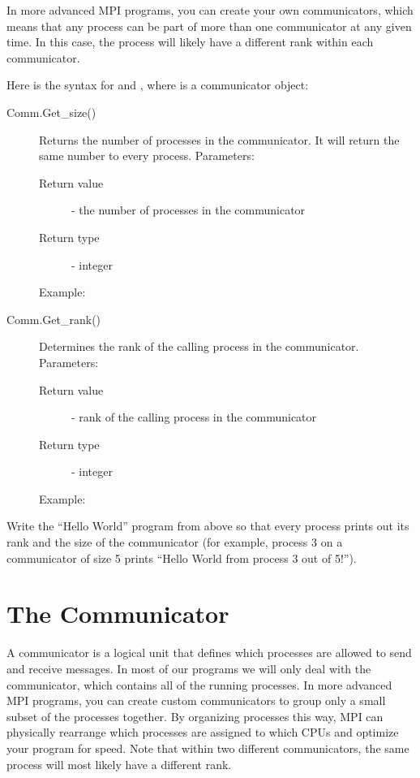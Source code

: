 In more advanced MPI programs, you can create your own communicators, which means that 
any process can be part of more than one communicator at any given time. 
In this case, the process will likely have a different rank within each communicator.


Here is the syntax for  and , where  is a communicator object:
\begin{description}
\item[Comm.Get\_size()]
Returns the number of processes in the communicator. It will return the same number to every process.
Parameters:
\begin{description}
    \item[Return value] - the number of processes in the communicator
    \item[Return type] - integer
\end{description}
Example:

\item[Comm.Get\_rank()]
Determines the rank of the calling process in the communicator.
Parameters:
\begin{description}
    \item[Return value] - rank of the calling process in the communicator
    \item[Return type] - integer
\end{description}
Example:

\end{description}

\begin{problem}
Write the ``Hello World'' program from above so that every process prints out its 
rank and the size of the communicator 
(for example, process 3 on a communicator of size 5 prints ``Hello World from process 3 out of 5!'').
\end{problem}

\section*{The Communicator}
A communicator is a logical unit that defines which processes are allowed to 
send and receive messages. In most of our programs we will only deal with the  
communicator, which contains all of the running processes. 
In more advanced MPI programs, you can create custom communicators to group only a small 
subset of the processes together. By organizing processes this way, MPI can 
physically rearrange which processes are assigned to which CPUs and optimize your 
program for speed. Note that within two different communicators, the same process 
will most likely have a different rank.

